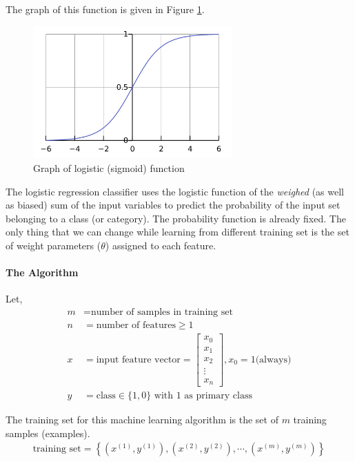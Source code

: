 The graph of this function is given in Figure \ref{fig:sigmoid}.
\begin{figure}[h!]\centering
  \includegraphics[width=3in]{fig/sigmoid}
  \caption{Graph of logistic (sigmoid) function}\label{fig:sigmoid}
\end{figure}

The logistic regression classifier uses the logistic function of the {\em weighed}
(as well as biased) sum of the input variables to predict the probability of
the input set belonging to a class (or category). The probability function is
already fixed. The only thing that we can change while learning from different
training set is the set of weight parameters ($\theta$) assigned to each feature.

\paragraph{The Algorithm}\hfill

Let,
\begin{align}
  m &= \text{number of samples in training set}
  \nonumber\\
  n &= \text{number of features} \ge 1
  \nonumber\\
  x &= \text{input feature vector} =
  \begin{bmatrix}
  x_0 \\ x_1 \\ x_2 \\ \vdots \\ x_n
  \end{bmatrix}, x_0 = 1 \text{(always)}
  \nonumber\\
  y &= \text{class} \in \{ 1, 0 \} \text{ with 1 as primary class}
  \nonumber
\end{align}

The training set for this machine learning algorithm is the set of $m$ training
samples (examples).
\begin{align}
  \text{training set} =
  \left\{ (x^{(1)}, y^{(1)}), (x^{(2)}, y^{(2)}), \cdots , (x^{(m)}, y^{(m)}) \right\}
  \label{eqn:training-set}
\end{align}

